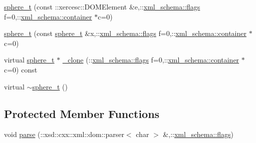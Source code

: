 \begin{DoxyCompactItemize}
\item 
\hyperlink{classsphere__t_a9fcc000c87c32145765cd136e4f19e9a}{sphere\-\_\-t} (const \-::xercesc\-::\-D\-O\-M\-Element \&e,\-::\hyperlink{namespacexml__schema_a0612287d030cb2732d31a45b258fdc87}{xml\-\_\-schema\-::flags} f=0,\-::\hyperlink{namespacexml__schema_ada9aa30dc722e93ee2ed7243085402a5}{xml\-\_\-schema\-::container} $\ast$c=0)
\item 
\hyperlink{classsphere__t_a7a07c901e904b7662c37e609e6a505d2}{sphere\-\_\-t} (const \hyperlink{classsphere__t}{sphere\-\_\-t} \&x,\-::\hyperlink{namespacexml__schema_a0612287d030cb2732d31a45b258fdc87}{xml\-\_\-schema\-::flags} f=0,\-::\hyperlink{namespacexml__schema_ada9aa30dc722e93ee2ed7243085402a5}{xml\-\_\-schema\-::container} $\ast$c=0)
\item 
virtual \hyperlink{classsphere__t}{sphere\-\_\-t} $\ast$ \hyperlink{classsphere__t_af9cd6acbc366d507146512038a054d3f}{\-\_\-clone} (\-::\hyperlink{namespacexml__schema_a0612287d030cb2732d31a45b258fdc87}{xml\-\_\-schema\-::flags} f=0,\-::\hyperlink{namespacexml__schema_ada9aa30dc722e93ee2ed7243085402a5}{xml\-\_\-schema\-::container} $\ast$c=0) const 
\item 
virtual \hyperlink{classsphere__t_a857c5c67e4649983f9d3228131262d0e}{$\sim$sphere\-\_\-t} ()
\end{DoxyCompactItemize}
\subsection*{Protected Member Functions}
\begin{DoxyCompactItemize}
\item 
void \hyperlink{classsphere__t_a8a9b83d8906f45ca3ee33b11e54543b5}{parse} (\-::xsd\-::cxx\-::xml\-::dom\-::parser$<$ char $>$ \&,\-::\hyperlink{namespacexml__schema_a0612287d030cb2732d31a45b258fdc87}{xml\-\_\-schema\-::flags})
\end{DoxyCompactItemize}
